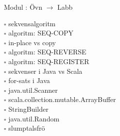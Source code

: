 
    Modul : Övn  $\rightarrow$ Labb 
    \begin{multicols}{3}\SlideFontTiny
    $\square$ sekvensalgoritm \\
$\square$ algoritm: SEQ-COPY \\
$\square$ in-place vs copy \\
$\square$ algoritm: SEQ-REVERSE \\
$\square$ algoritm: SEQ-REGISTER \\
$\square$ sekvenser i Java vs Scala \\
$\square$ for-sats i Java \\
$\square$ java.util.Scanner \\
$\square$ scala.collection.mutable.ArrayBuffer \\
$\square$ StringBuilder \\
$\square$ java.util.Random \\
$\square$ slumptalsfrö \\
    \end{multicols}
    